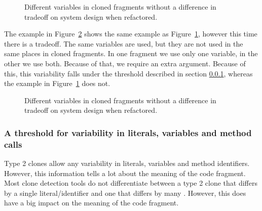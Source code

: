 \begin{figure}[H]
\begin{parcolumns}{2}
\end{parcolumns}
\caption{Different variables in cloned fragments without a difference in tradeoff on system design when refactored.}
\label{fig:type2variablerefactoringnotradeoff}
\end{figure}

The example in Figure~\ref{fig:type2variablerefactoringwithtradeoff} shows the same example as Figure~\ref{fig:type2variablerefactoringnotradeoff}, however this time there is a tradeoff. The same variables are used, but they are not used in the same places in cloned fragments. In one fragment we use only one variable, in the other we use both. Because of that, we require an extra argument. Because of this, this variability falls under the threshold described in section \ref{sec:variabilitythreshold}, whereas the example in Figure~\ref{fig:type2variablerefactoringnotradeoff} does not.

\begin{figure}[H]
\begin{parcolumns}{2}
\end{parcolumns}
\caption{Different variables in cloned fragments without a difference in tradeoff on system design when refactored.}
\label{fig:type2variablerefactoringwithtradeoff}
\end{figure}

\subsubsection{A threshold for variability in literals, variables and method calls}\label{sec:variabilitythreshold}
Type 2 clones allow any variability in literals, variables and method identifiers. However, this information tells a lot about the meaning of the code fragment. Most clone detection tools do not differentiate between a type 2 clone that differs by a single literal/identifier and one that differs by many \cite{roy2009comparison}. However, this does have a big impact on the meaning of the code fragment.

